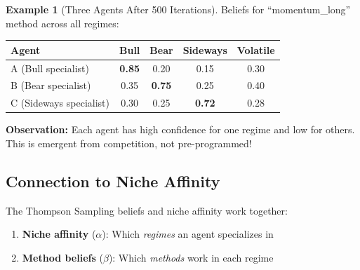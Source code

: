 \documentclass[11pt,a4paper]{article}
\theoremstyle{definition}
\newtheorem{example}{Example}[section]
\theoremstyle{plain}
\begin{document}
\begin{example}[Three Agents After 500 Iterations]
Beliefs for ``momentum\_long'' method across all regimes:

\begin{center}
\begin{tabular}{l|cccc}
\toprule
Agent & Bull & Bear & Sideways & Volatile \\
\midrule
A (Bull specialist) & \textbf{0.85} & 0.20 & 0.15 & 0.30 \\
B (Bear specialist) & 0.35 & \textbf{0.75} & 0.25 & 0.40 \\
C (Sideways specialist) & 0.30 & 0.25 & \textbf{0.72} & 0.28 \\
\bottomrule
\end{tabular}
\end{center}

\textbf{Observation:} Each agent has high confidence for one regime and low for others. This is emergent from competition, not pre-programmed!
\end{example}

\subsection{Connection to Niche Affinity}

The Thompson Sampling beliefs and niche affinity work together:

\begin{enumerate}
    \item \textbf{Niche affinity} ($\alpha$): Which \textit{regimes} an agent specializes in
    \item \textbf{Method beliefs} ($\beta$): Which \textit{methods} work in each regime
\end{enumerate}
\end{document}
